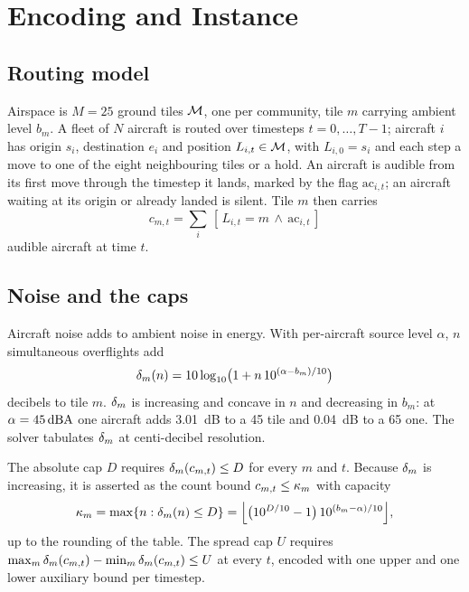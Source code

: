 \section{Encoding and Instance}
\label{sec:encoding}

\subsection{Routing model}
\label{sec:routing-model}

Airspace is $M=25$ ground tiles $\mathcal{M}$, one per community, tile $m$ carrying ambient
level $b_m$. A fleet of $N$ aircraft is routed over timesteps $t=0,\dots,T-1$; aircraft
$i$ has origin $s_i$, destination $e_i$ and position $L_{i,t}\in\mathcal{M}$, with
$L_{i,0}=s_i$ and each step a move to one of the eight neighbouring tiles or a hold. An
aircraft is audible from its first move through the timestep it lands, marked by the flag
$\mathrm{ac}_{i,t}$; an aircraft waiting at its origin or already landed is silent. Tile
$m$ then carries
\begin{equation}
c_{m,t}=\textstyle\sum_{i}\,[\,L_{i,t}=m \,\wedge\, \mathrm{ac}_{i,t}\,]
\label{eq:count}
\end{equation}
audible aircraft at time $t$.

\subsection{Noise and the caps}
\label{sec:noise-model}

Aircraft noise adds to ambient noise in energy. With per-aircraft source level $\alpha$,
$n$ simultaneous overflights add
\begin{equation}
\delta_m(n)=10\log_{10}\bigl(1+n\,10^{(\alpha-b_m)/10}\bigr)
\label{eq:db}
\end{equation}
decibels to tile $m$. $\delta_m$ is increasing and concave in $n$ and decreasing in $b_m$:
at $\alpha=45\,\textup{dBA}$ one aircraft adds \SI{3.01}{\dB} to a \SI{45}{\dBA} tile and
\SI{0.04}{\dB} to a \SI{65}{\dBA} one. The solver tabulates $\delta_m$ at centi-decibel
resolution.

The absolute cap $D$ requires $\delta_m(c_{m,t})\le D$ for every $m$ and $t$. Because
$\delta_m$ is increasing, it is asserted as the count bound $c_{m,t}\le\kappa_m$ with
capacity
\begin{equation}
\kappa_m=\max\{n:\delta_m(n)\le D\}
=\Bigl\lfloor\bigl(10^{D/10}-1\bigr)\,10^{(b_m-\alpha)/10}\Bigr\rfloor ,
\label{eq:capclosed}
\end{equation}
up to the rounding of the table. The spread cap $U$ requires
$\max_m\delta_m(c_{m,t})-\min_m\delta_m(c_{m,t})\le U$ at every $t$, encoded with one
upper and one lower auxiliary bound per timestep.

